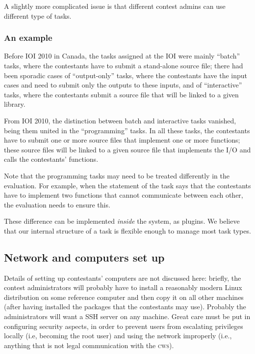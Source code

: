 \documentclass[a4paper,8pt]{amsart}
\newcommand{\CWS}{\textsc{cws}}
\begin{document}
\begin{multicols}{2}
  A slightly more complicated issue is that different contest admins
  can use different type of tasks.

  \subsubsection{An example}

  Before IOI 2010 in Canada, the tasks assigned at the IOI were mainly
  ``batch'' tasks, where the contestants have to submit a stand-alone
  source file; there had been sporadic cases of ``output-only'' tasks,
  where the contestants have the input cases and need to submit only
  the outputs to these inputs, and of ``interactive'' tasks, where the
  contestants submit a source file that will be linked to a given
  library.

  From IOI 2010, the distinction between batch and interactive tasks
  vanished, being them united in the ``programming'' tasks. In all
  these tasks, the contestants have to submit one or more source files
  that implement one or more functions; these source files will be
  linked to a given source file that implements the I/O and calls the
  contestants' functions.

  Note that the programming tasks may need to be treated differently
  in the evaluation. For example, when the statement of the task says
  that the contestants have to implement two functions that cannot
  communicate between each other, the evaluation needs to ensure this.

  These difference can be implemented \emph{inside\/} the system, as
  plugins. We believe that our internal structure of a task is
  flexible enough to manage most task types.


  \subsection{Network and computers set up}

  Details of setting up contestants' computers are not discussed here:
  briefly, the contest administrators will probably have to install a
  reasonably modern Linux distribution on some reference computer and
  then copy it on all other machines (after having installed the
  packages that the contestants may use). Probably the administrators
  will want a SSH server on any machine. Great care must be put in
  configuring security aspects, in order to prevent users from
  escalating privileges locally (i.e, becoming the root user) and
  using the network improperly (i.e., anything that is not legal
  communication with the \CWS).


\end{multicols}
\end{document}

